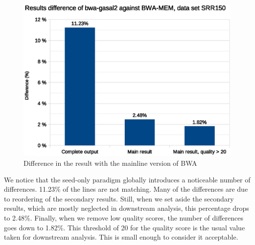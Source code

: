 \begin{figure}[h!]
	\centering
	\includegraphics[width=1\linewidth]{srr150/score-check}
	\caption{Difference in the result with the mainline version of BWA}
	\label{fig:result-diff-srr150}
\end{figure}

We notice that the seed-only paradigm globally introduces a noticeable number of differences. 11.23\% of the lines are not matching. Many of the differences are due to reordering of the secondary results. Still, when we set aside the secondary results, which are mostly neglected in downstream analysis, this percentage drops to 2.48\%. Finally, when we remove low quality scores, the number of differences goes down to 1.82\%. This threshold of 20 for the quality score is the usual value taken for downstream analysis. This is small enough to consider it acceptable.


